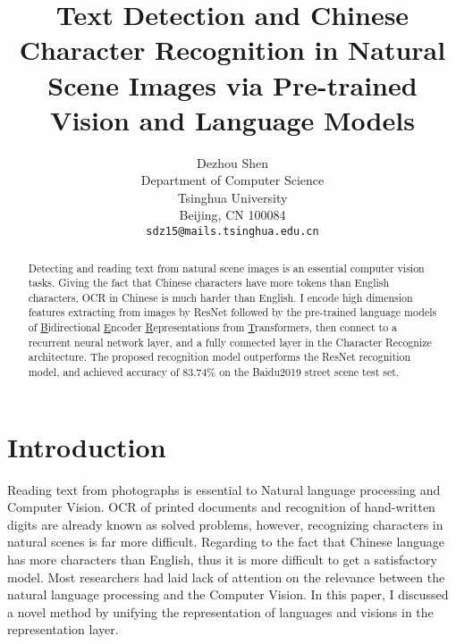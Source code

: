 \documentclass[10pt,twocolumn,letterpaper]{article}
\begin{document}
\title{Text Detection and Chinese Character Recognition in Natural Scene Images via Pre-trained Vision and Language Models}

\author{Dezhou Shen\\
Department of Computer Science\\
Tsinghua University\\
Beijing, CN 100084\\
{\tt\small sdz15@mails.tsinghua.edu.cn}
}

\maketitle
\ificcvfinal\thispagestyle{empty}\fi

\begin{abstract}

  Detecting and reading text from natural scene images is an essential computer vision tasks.
  Giving the fact that Chinese characters have more tokens than English characters, OCR in Chinese is much harder than English.
  I encode high dimension features extracting from images by ResNet followed by the pre-trained language models of
  \underline{B}idirectional \underline{E}ncoder \underline{R}epresentations from \underline{T}ransformers,
  then connect to a recurrent neural network layer, and a fully connected layer in the Character Recognize architecture.
  The proposed recognition model outperforms the ResNet recognition model, and achieved accuracy of $83.74\%$ on the Baidu2019 street scene test set.

\end{abstract}

\section{Introduction}

  Reading text from photographs is essential to Natural language processing and Computer Vision.
  OCR of printed documents and recognition of hand-written digits are already known as solved problems,
  however, recognizing characters in natural scenes is far more difficult.
  Regarding to the fact that Chinese language has more characters than English, thus it is more difficult to get a satisfactory model.
  Most researchers had laid lack of attention on the relevance between the natural language processing and the Computer Vision.
  In this paper, I discussed a novel method by unifying the representation of languages and visions in the representation layer.
\end{document}
